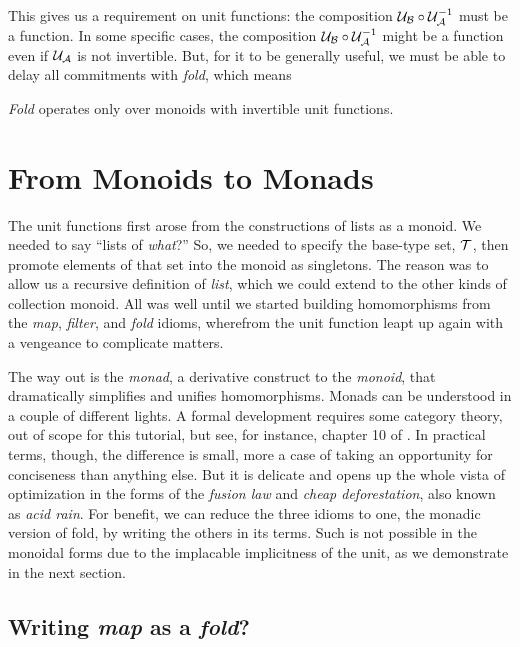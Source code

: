 This gives us a requirement on unit functions: the composition $\mathcal{U}_{\mathcal{B}}\circ{\mathcal{U}}^{-1}_{\mathcal{A}}$ must be a function. In some specific cases, the composition $\mathcal{U}_{\mathcal{B}}\circ{\mathcal{U}}^{-1}_{\mathcal{A}}$ might be a function even if $\mathcal{U}_{\mathcal{A}}$ is not invertible. But, for it to be generally useful, we must be able to delay all commitments with \emph{fold}, which means


\begin{observation}
  \emph{Fold} operates only over monoids with invertible unit functions.
\end{observation}


\section{\color{Red}From Monoids to Monads}


The unit functions first arose from the constructions of lists as a monoid. We needed to say ``lists of \emph{what}?'' So, we needed to specify the base-type set, $\mathcal{T}$, then promote elements of that set into the monoid as singletons. The reason was to allow us a recursive definition of \emph{list}, which we could extend to the other kinds of collection monoid. All was well until we started building homomorphisms from the \emph{map}, \emph{filter}, and \emph{fold} idioms, wherefrom the unit function leapt up again with a vengeance to complicate matters.


The way out is the \emph{monad}, a derivative construct to the \emph{monoid}, that dramatically simplifies and unifies homomorphisms. Monads can be understood in a couple of different lights. A formal development requires some category theory, out of scope for this tutorial, but see, for instance, chapter 10 of \cite{arrows}. In practical terms, though, the difference is small, more a case of taking an opportunity for conciseness than anything else. But it is delicate and opens up the whole vista of optimization in the forms of the \emph{fusion law} and \emph{cheap deforestation}, also known as \emph{acid rain}. For benefit, we can reduce the three idioms to one, the monadic version of fold, by writing the others in its terms. Such is not possible in the monoidal forms due to the implacable implicitness of the unit, as we demonstrate in the next section.


\subsection{\color{red}Writing \emph{map} as a \emph{fold}?}


